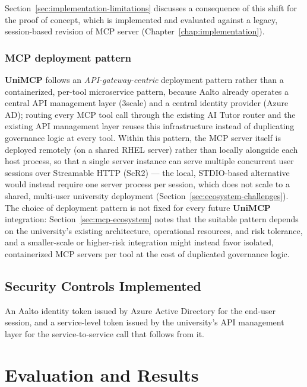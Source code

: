 \documentclass[english, 12pt, a4paper, elec, utf8, a-2b, online]{aaltothesis}
\newcommand{\UniMCP}{\textbf{UniMCP}\xspace}
\begin{document}
Section~\ref{sec:implementation-limitations} discusses a consequence of this shift for the proof of
concept, which is implemented and evaluated against a legacy, session-based revision of MCP server (Chapter~\ref{chap:implementation}).

\subsubsection{MCP deployment pattern}
\UniMCP follows an \emph{API-gateway-centric} deployment pattern rather than a containerized,
per-tool microservice pattern, because Aalto already operates a central API management layer
(3scale) and a central identity provider (Azure AD); routing every MCP tool call through the existing AI Tutor router and the existing API management layer reuses this infrastructure instead of
duplicating governance logic at every tool. Within this pattern, the MCP server itself is deployed
remotely (on a shared RHEL server) rather than locally alongside each host process, so that a single
server instance can serve multiple concurrent user sessions over Streamable HTTP (ScR2) --- the
local, STDIO-based alternative would instead require one server process per session, which does not
scale to a shared, multi-user university deployment (Section~\ref{sec:ecosystem-challenges}). The
choice of deployment pattern is not fixed for every future \UniMCP integration: Section~\ref{sec:mcp-ecosystem} notes that the suitable pattern depends on the university's existing
architecture, operational resources, and risk tolerance, and a smaller-scale or higher-risk
integration might instead favor isolated, containerized MCP servers per tool at the cost of
duplicated governance logic.

\subsection{Security Controls Implemented}
An Aalto identity token issued by Azure Active Directory for the end-user session, and a service-level token issued by the university's API management layer for the service-to-service call
that follows from it. 

\clearpage
\section{Evaluation and Results}
\label{chap:evaluation}
\end{document}
